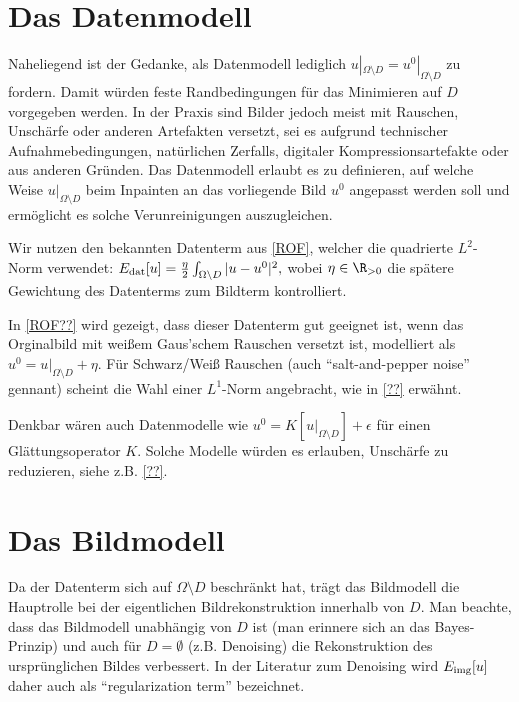 \documentclass{mythesis}
\begin{document}
\section{Das Datenmodell}

Naheliegend ist der Gedanke, als Datenmodell lediglich $u|_{\Omega \setminus D} = u^0|_{\Omega \setminus D}$ zu fordern.
Damit würden feste Randbedingungen für das Minimieren auf $D$ vorgegeben werden.
In der Praxis sind Bilder jedoch meist mit Rauschen, Unschärfe oder anderen Artefakten versetzt, sei es aufgrund technischer Aufnahmebedingungen, natürlichen Zerfalls, digitaler Kompressionsartefakte oder aus anderen Gründen.
Das Datenmodell erlaubt es zu definieren, auf welche Weise $u|_{\Omega \setminus D}$ beim Inpainten an das vorliegende Bild $u^0$ angepasst werden soll und ermöglicht es solche Verunreinigungen auszugleichen.

Wir nutzen den bekannten Datenterm aus \ref{ROF}, welcher die quadrierte $L^2$-Norm verwendet:
\begin{math}
    E_{\mathrm{dat}}[u] = \frac{\eta}{2} \int_{\Omega \setminus D} |u - u^0|^2,
\end{math}
wobei $\eta \in \R_{> 0}$ die spätere Gewichtung des Datenterms zum Bildterm kontrolliert.

In \ref{ROF??} wird gezeigt, dass dieser Datenterm gut geeignet ist, wenn das Orginalbild mit weißem Gaus'schem Rauschen versetzt ist, modelliert als $u^0 = u|_{\Omega \setminus D} + \eta$.
Für Schwarz/Weiß Rauschen (auch “salt-and-pepper noise” gennant) scheint die Wahl einer $L^1$-Norm angebracht, wie in \ref{??} erwähnt.

Denkbar wären auch Datenmodelle wie $u^0 = K[u|_{\Omega\setminus D}] + \epsilon$ für einen Glättungsoperator $K$.
Solche Modelle würden es erlauben, Unschärfe zu reduzieren, siehe z.B. \ref{??}.


\section{Das Bildmodell}

Da der Datenterm sich auf $\Omega \setminus D$ beschränkt hat, trägt das Bildmodell die Hauptrolle bei der eigentlichen Bildrekonstruktion innerhalb von $D$.
Man beachte, dass das Bildmodell unabhängig von $D$ ist (man erinnere sich an das Bayes-Prinzip) und auch für $D = \emptyset$ (z.B. Denoising) die Rekonstruktion des ursprünglichen Bildes verbessert.
In der Literatur zum Denoising wird $E_{\mathrm{img}}[u]$ daher auch als “regularization term” bezeichnet.
\end{document}
